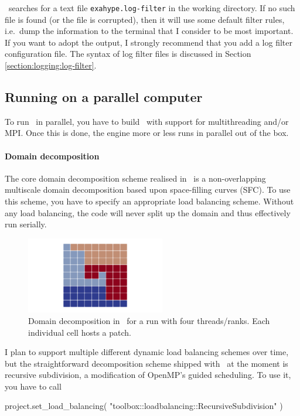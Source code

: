 \ExaHyPE\ searches for a text file \texttt{exahype.log-filter} in the working
directory.
If no such file is found (or the file is corrupted), then it will use some
default filter rules, i.e.~dump the information to the terminal that I consider
to be most important.
If you want to adopt the output, I strongly recommend that you add a log filter
configuration file. 
The syntax of log filter files is discussed in Section
\ref{section:logging:log-filter}.



\subsection{Running on a parallel computer}

To run \ExaHyPE\ in parallel, you have to build \Peano\ with support for
multithreading and/or MPI.
Once this is done, the engine more or less runs in parallel out of the box.


\paragraph{Domain decomposition}
The core domain decomposition scheme realised in \ExaHyPE\ is a non-overlapping
multiscale domain decomposition based upon space-filling curves (SFC).
To use this scheme, you have to specify an appropriate load balancing scheme.
Without any load balancing, the code will never split up the domain and thus
effectively run serially.

\begin{figure}
 \begin{center}
  \includegraphics[width=0.54\textwidth]{60_exahype/domain-decomposition.png}
 \end{center}
 \caption{
  Domain decomposition in \ExaHyPE\ for a run with four threads/ranks. Each
  individual cell hosts a patch.
 }
\end{figure}


I plan to support multiple different dynamic load balancing schemes over time,
but the straightforward decomposition scheme shipped with \Peano\ at the moment
is recursive subdivision, a modification of OpenMP's guided scheduling.
To use it, you have to call
\begin{code}
project.set_load_balancing( "toolbox::loadbalancing::RecursiveSubdivision" )
\end{code}

